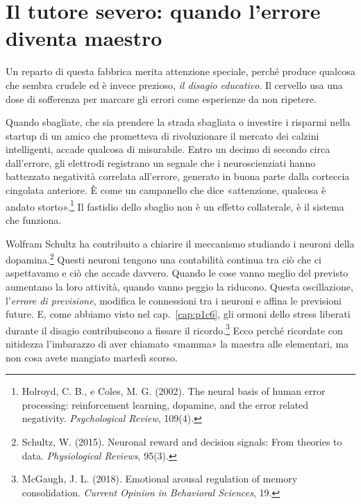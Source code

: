 \section{Il tutore severo: quando l'errore diventa maestro}

Un reparto di questa fabbrica merita attenzione speciale, perché produce qualcosa che sembra crudele ed è invece prezioso, \textit{il disagio educativo}. Il cervello usa una dose di sofferenza per marcare gli errori come esperienze da non ripetere.

Quando sbagliate, che sia prendere la strada sbagliata o investire i risparmi nella startup di un amico che prometteva di rivoluzionare il mercato dei calzini intelligenti, accade qualcosa di misurabile. Entro un decimo di secondo circa dall'errore, gli elettrodi registrano un segnale che i neuroscienziati hanno battezzato negatività correlata all'errore, generato in buona parte dalla corteccia cingolata anteriore. È come un campanello che dice «attenzione, qualcosa è andato storto».\footnote{Holroyd, C. B., e Coles, M. G. (2002). The neural basis of human error processing: reinforcement learning, dopamine, and the error related negativity. \textit{Psychological Review}, 109(4).} Il fastidio dello sbaglio non è un effetto collaterale, è il sistema che funziona.

Wolfram Schultz ha contribuito a chiarire il meccanismo studiando i neuroni della dopamina.\footnote{Schultz, W. (2015). Neuronal reward and decision signals: From theories to data. \textit{Physiological Reviews}, 95(3).} Questi neuroni tengono una contabilità continua tra ciò che ci aspettavamo e ciò che accade davvero. Quando le cose vanno meglio del previsto aumentano la loro attività, quando vanno peggio la riducono. Questa oscillazione, l'\textit{errore di previsione}, modifica le connessioni tra i neuroni e affina le previsioni future. E, come abbiamo visto nel cap.~\ref{cap:p1c6}, gli ormoni dello stress liberati durante il disagio contribuiscono a fissare il ricordo.\footnote{McGaugh, J. L. (2018). Emotional arousal regulation of memory consolidation. \textit{Current Opinion in Behavioral Sciences}, 19.} Ecco perché ricordate con nitidezza l'imbarazzo di aver chiamato «mamma» la maestra alle elementari, ma non cosa avete mangiato martedì scorso.


